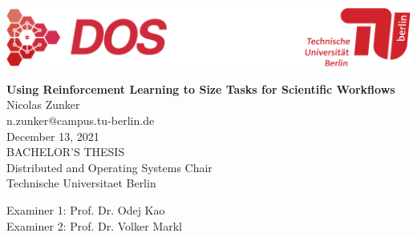 
\thispagestyle{empty}

\includegraphics[width=\linewidth]{fig/Logo_Header}
\mbox{}\\[1pc]
\begin{center}
    \huge{ \bfseries Using Reinforcement Learning to Size Tasks for Scientific Workflows}\\[2pc]

    \Large{Nicolas Zunker}\\
    \large{n.zunker@campus.tu-berlin.de}\\[1pc]
    \large{December 13, 2021}\\[2pc]

    BACHELOR'S THESIS\\
    Distributed and Operating Systems Chair\\
    Technische Universitaet Berlin
\end{center}
\vfill

Examiner 1: Prof. Dr. Odej Kao
\hfill{}\\
Examiner 2: Prof. Dr. Volker Markl

\afterpage{\null\thispagestyle{empty}\newpage}
